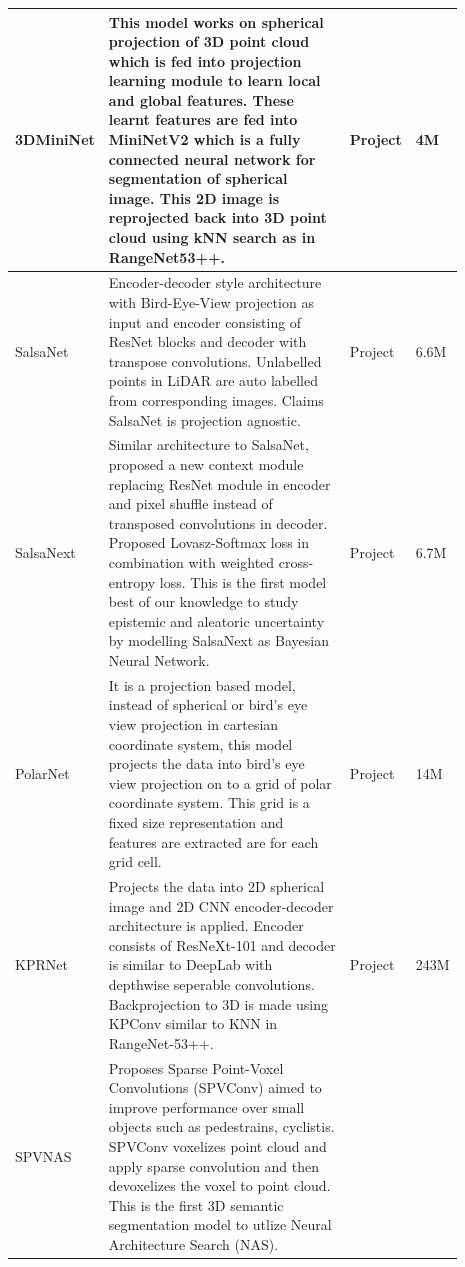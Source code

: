 \begin{longtable}{|p{0.15\linewidth} | p{0.59\linewidth}| p{0.06\linewidth} |p{0.09\linewidth}|}
        \hline 
        3DMiniNet\cite{3Dmininet} &
        This model works on spherical projection of 3D point cloud which is fed into projection learning module to learn local and global features.
        These learnt features are fed into MiniNetV2 which is a fully connected neural network for segmentation of spherical image.
        This 2D image is reprojected back into 3D point cloud using kNN search as in RangeNet53++.
        & Project & 4M \\
        \hline
        SalsaNet\cite{salsanet2020} & Encoder-decoder style architecture with Bird-Eye-View projection as input and encoder consisting of ResNet blocks and decoder with transpose convolutions.
        Unlabelled points in LiDAR are auto labelled from corresponding images. Claims SalsaNet is projection agnostic.
        & Project & 6.6M \\
        \hline
        SalsaNext\cite{SalsaNext_2020} & 
        Similar architecture to SalsaNet, proposed a new context module replacing ResNet module in encoder and pixel shuffle instead of transposed convolutions in decoder.
        Proposed Lovasz-Softmax loss in combination with weighted cross-entropy loss.
        This is the first model best of our knowledge to study epistemic and aleatoric uncertainty by modelling SalsaNext as Bayesian Neural Network.
        & Project & 6.7M \\
        \hline
        PolarNet\cite{polarnet} &
        It is a projection based model, instead of spherical or bird's eye view projection in cartesian coordinate system, this model projects the data into bird's eye view projection on to a grid of polar coordinate system.
        This grid is a fixed size representation and features are extracted are for each grid cell.
        & Project & 14M \\
        \hline
        KPRNet\cite{kochanov2020kprnet} &
        Projects the data into 2D spherical image and 2D CNN encoder-decoder architecture is applied.
        Encoder consists of ResNeXt-101 and decoder is similar to DeepLab with depthwise seperable convolutions.
        Backprojection to 3D is made using KPConv similar to KNN in RangeNet-53++.
        & Project & 243M \\
        \hline
        SPVNAS\cite{spvnas} &
        Proposes Sparse Point-Voxel Convolutions (SPVConv) aimed to improve performance over small objects such as pedestrains, cyclistis.
        SPVConv voxelizes point cloud and apply sparse convolution and then devoxelizes the voxel to point cloud.
        This is the first 3D semantic segmentation model to utlize Neural Architecture Search (NAS).

\end{longtable}
